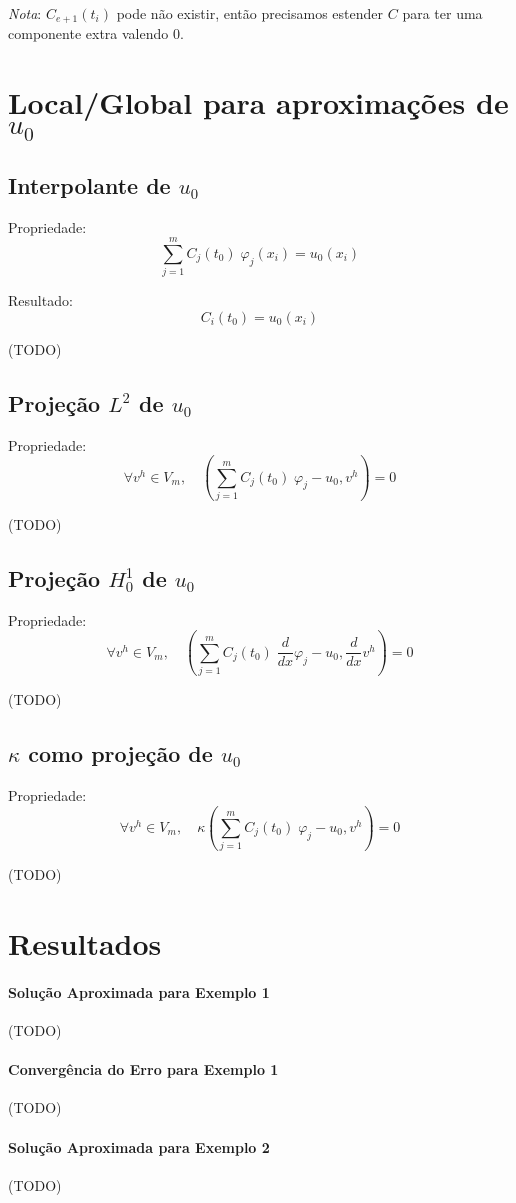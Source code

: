 \documentclass[a4paper]{article}
\newcommand{\vphi}{\varphi}
\begin{document}
\emph{Nota}: \(C_{e+1}(t_i)\) pode não existir,
então precisamos estender \(C\)
para ter uma componente extra valendo \(0\).

\section{Local/Global para aproximações de \texorpdfstring{\(u_0\)}{u0}}
\label{sec:U0}

\subsection{Interpolante de \texorpdfstring{\(u_0\)}{u0}}

Propriedade:
\[
    \sum_{j=1}^m{ C_j(t_0) \; \vphi_j(x_i) } = u_0(x_i)
\]

Resultado:
\[
    C_i(t_0) = u_0(x_i)
\]

(TODO)

\subsection{Projeção \texorpdfstring{\(L^2\)}{L2} de \texorpdfstring{\(u_0\)}{u0}}

Propriedade:
\[
    \forall v^h \in V_m, \quad
    (\sum_{j=1}^m{ C_j(t_0) \; \vphi_j } - u_0, v^h) = 0
\]

(TODO)

\subsection{Projeção \texorpdfstring{\(H^1_0\)}{H10} de \texorpdfstring{\(u_0\)}{u0}}

Propriedade:
\[
    \forall v^h \in V_m, \quad
    (\sum_{j=1}^m{ C_j(t_0) \; \frac{d}{dx}\vphi_j } - u_0, \frac{d}{dx}v^h) = 0
\]

(TODO)

\subsection{\texorpdfstring{\(\kappa\)}{Kappa} como projeção de \texorpdfstring{\(u_0\)}{u0}}

Propriedade:
\[
    \forall v^h \in V_m, \quad
    \kappa(\sum_{j=1}^m{ C_j(t_0) \; \vphi_j } - u_0, v^h) = 0
\]

(TODO)

\newpage
\section{Resultados}

\paragraph{Solução Aproximada para Exemplo 1}

(TODO)

\paragraph{Convergência do Erro para Exemplo 1}

(TODO)

\paragraph{Solução Aproximada para Exemplo 2}

(TODO)
\end{document}
